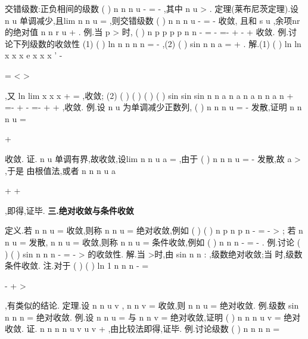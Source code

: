 \textcolor{lyred}{交错级数}:正负相间的级数
(
)
n
n
n
u
\infty 
-
=
-
\sum 
,其中
n
u >
. 
\textcolor{lyred}{定理(莱布尼茨定理)}.设
n
u 单调减少,且lim
n
n
u
\to \infty 
=
,则交错级数
(
)
n
n
n
u
\infty 
-
=
-
\sum 
收敛, 
且和
s
u
\le 
,余项nr 的绝对值
n
n
r
u +
\le 
. 
\textcolor{lyred}{例}.当
p >
时,
(
)
n
p
p
p
p
n
n
\infty 
-
=
-
=-
+
-
+
\sum 
\Lambda 收敛. 
\textcolor{lyred}{例}.讨论下列级数的收敛性 
(1)
(
)
ln
n
n
n
n
\infty 
=
-
\sum 
,(2)
(
)
sin
n
n
a
\pi 
\infty 
=
+
\sum 
. 
解.(1)
(
)
ln
ln
x
x
x
e
x
x x
'
-

=
<
>




,又
ln
lim
x
x
x
\to +\infty 
=
,收敛; 
(2)
(
)
(
)
(
)
(
)
sin
sin
sin
n
n
a
n
a
n
a
n
n
a
n
\pi 
\pi 
\pi 
\pi 
+
=-
+
-
=-
+
+
,收敛. 
\textcolor{lyred}{例}.设
n
u 为单调减少正数列,
(
)
n
n
n
u
\infty 
=
-
\sum 
发散,证明
n
n
n
u
\infty 
=




+


\sum 
收敛. 
证.
n
u 单调有界,故收敛,设lim
n
n
u
a
\to \infty 
=
\ge 
,由于
(
)
n
n
n
u
\infty 
=
-
\sum 
发散,故
a >
,于是 
由根值法,或者
n
n
n
u
a




\le 
\le 




+
+




,即得,证毕. 
\vspace{4pt}
{\bfseries \textcolor{lyred}{三.绝对收敛与条件收敛}}

\textcolor{lyred}{定义}.若
n
n
u
\infty 
=\sum 
收敛,则称
n
n
u
\infty 
=\sum 
\textcolor{lyred}{绝对收敛},例如
(
)
(
)
n
p
n
p
n
\infty 
-
=
-
>
\sum 
; 
若
n
n
u
\infty 
=\sum 
发散,
n
n
u
\infty 
=\sum 
收敛,则称
n
n
u
\infty 
=\sum 
\textcolor{lyred}{条件收敛},例如
(
)
n
n
n
\infty 
-
=
-
\sum 
. 
\textcolor{lyred}{例}.讨论
(
)
(
)
sin
n
n
n\alpha \alpha 
\infty 
-
=
-
>
\sum 
的收敛性. 
解.当
\alpha >时,由
sin n
n
\alpha 
\alpha 
:
,级数绝对收敛;当
\alpha \le 时,级数条件收敛. 
\textcolor{lyred}{注}.对于
(
)
(
)
ln 1
n
n
n\alpha 
\alpha 
\infty 
-
=


-
+
>




\sum 
,有类似的结论. 
\textcolor{lyred}{定理}.设
n
n
u
v
\le 
,
n
n
v
\infty 
=\sum 
收敛,则
n
n
u
\infty 
=\sum 
绝对收敛. 
\textcolor{lyred}{例}.级数
sin
n
n
n
\alpha 
\infty 
=\sum 
绝对收敛.\textcolor{lyred}{ }
\textcolor{lyred}{例}.设
n
n
u
\infty 
=\sum 
与
n
n
v
\infty 
=\sum 
绝对收敛,证明
(
)
n
n
n
u
v
\infty 
=
\pm 
\sum 
绝对收敛. 
证.
n
n
n
n
u
v
u
v
\pm 
\le 
+
,由比较法即得,证毕. 
\textcolor{lyred}{例}.讨论级数
(
)
n
n
n
n
\infty 
=


